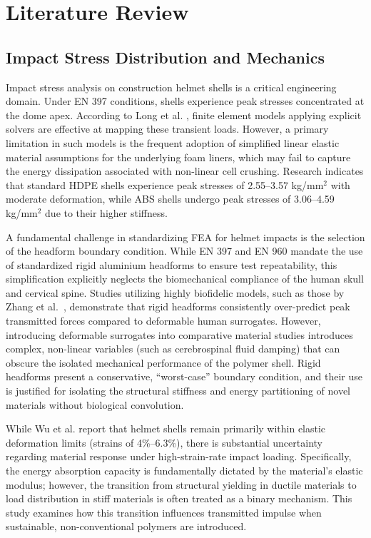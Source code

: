 \chapter{Literature Review}

\section{Impact Stress Distribution and Mechanics}
Impact stress analysis on construction helmet shells is a critical engineering 
domain. Under EN 397 conditions, shells experience peak stresses concentrated 
at the dome apex. According to Long et al. \cite{long2015}, finite element 
models applying explicit solvers are effective at mapping these transient 
loads. However, a primary limitation in such models is the frequent 
adoption of simplified linear elastic material assumptions for the underlying 
foam liners, which may fail to capture the energy dissipation associated with 
non-linear cell crushing. Research indicates that standard HDPE shells 
experience peak stresses of 2.55--3.57 kg/mm$^2$ with moderate deformation, while ABS 
shells undergo peak stresses of 3.06--4.59 kg/mm$^2$ due to their higher stiffness.

A fundamental challenge in standardizing FEA for helmet impacts is the selection of the headform boundary condition. While EN 397 and EN 960 mandate the use of standardized rigid aluminium headforms to ensure test repeatability, this simplification explicitly neglects the biomechanical compliance of the human skull and cervical spine. Studies utilizing highly biofidelic models, such as those by Zhang et al.~\cite{zhang2017}, demonstrate that rigid headforms consistently over-predict peak transmitted forces compared to deformable human surrogates. However, introducing deformable surrogates into comparative material studies introduces complex, non-linear variables (such as cerebrospinal fluid damping) that can obscure the isolated mechanical performance of the polymer shell. Rigid headforms present a conservative, ``worst-case'' boundary condition, and their use is justified for isolating the structural stiffness and energy partitioning of novel materials without biological convolution.

While Wu et al. \cite{wu2022} report that helmet shells remain primarily 
within elastic deformation limits (strains of 4\%--6.3\%), there is 
substantial uncertainty regarding material response under high-strain-rate 
impact loading. Specifically, the energy absorption capacity is fundamentally 
dictated by the material's elastic modulus; however, the transition from 
structural yielding in ductile materials to load distribution in stiff 
materials is often treated as a binary mechanism. This study examines 
how this transition influences transmitted 
impulse when sustainable, non-conventional polymers are introduced.

